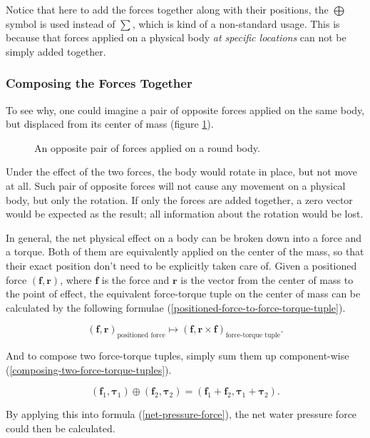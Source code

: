 Notice that here to add the forces together along with their positions, the $\bigoplus$ symbol is used instead of $\sum$, which is kind of a non-standard usage.
This is because that forces applied on a physical body \emph{at specific locations} can not be simply added together.

\subsubsection{Composing the Forces Together}

To see why, one could imagine a pair of opposite forces applied on the same body, but displaced from its center of mass (figure \ref{force-pair}).

\begin{figure}[h]
	\centering
	\caption{An opposite pair of forces applied on a round body.}
	\label{force-pair}
\end{figure}

Under the effect of the two forces, the body would rotate in place, but not move at all.
Such pair of opposite forces will not cause any movement on a physical body, but only the rotation.
If only the forces are added together, a zero vector would be expected as the result; all information about the rotation would be lost.

In general, the net physical effect on a body can be broken down into a force and a torque.
Both of them are equivalently applied on the center of the mass, so that their exact position don't need to be explicitly taken care of.
Given a positioned force $(\mathbf{f}, \mathbf{r})$, where $\mathbf{f}$ is the force and $\mathbf{r}$ is the vector from the center of mass to the point of effect, the equivalent force-torque tuple on the center of mass can be calculated by the following formulae (\ref{positioned-force-to-force-torque-tuple}).

\begin{equation}
	(\mathbf{f},\mathbf{r})_{\text{positioned force}}
	\mapsto
	(\mathbf{f},\mathbf{r}\times\mathbf{f})_{\text{force-torque tuple}}.
	\label{positioned-force-to-force-torque-tuple}
\end{equation}

And to compose two force-torque tuples, simply sum them up component-wise (\ref{composing-two-force-torque-tuples}).

\begin{equation}
	(\mathbf{f}_1,\mathbf{\tau}_1)
	\oplus
	(\mathbf{f}_2,\mathbf{\tau}_2)
	=
	(\mathbf{f}_1+\mathbf{f}_2,\mathbf{\tau}_1+\mathbf{\tau}_2).
	\label{composing-two-force-torque-tuples}
\end{equation}

By applying this into formula (\ref{net-pressure-force}), the net water pressure force could then be calculated.